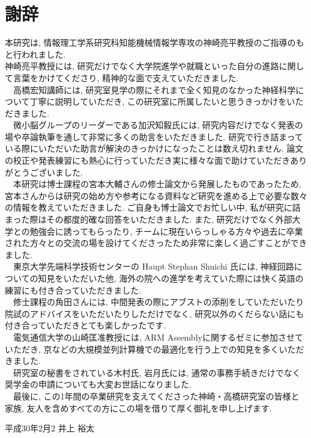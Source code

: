 \section*{謝辞}
本研究は, 情報理工学系研究科知能機械情報学専攻の神崎亮平教授のご指導のもと行われました.\\
神崎亮平教授には, 研究だけでなく大学院進学や就職といった自分の進路に関して言葉をかけてくださり, 精神的な面で支えていただきました.\\
　高橋宏知講師には, 研究室見学の際にそれまで全く知見のなかった神経科学について丁寧に説明していただき, この研究室に所属したいと思うきっかけをいただきました.\\
　微小脳グループのリーダーである加沢知毅氏には, 研究内容だけでなく発表の場や卒論執筆を通して非常に多くの助言をいただきました.
研究で行き詰まっている際にいただいた助言が解決のきっかけになったことは数え切れません. 論文の校正や発表練習にも熱心に行っていただき実に様々な面で助けていただきありがとうございました.\\
　本研究は博士課程の宮本大輔さんの修士論文から発展したものであったため, 宮本さんからは研究の始め方や参考になる資料など研究を進める上で必要な数々の情報を教えていただきました.
ご自身も博士論文でお忙しい中, 私が研究に詰まった際はその都度的確な回答をいただきました.
また, 研究だけでなく外部大学との勉強会に誘ってもらったり, チームに現在いらっしゃる方々や過去に卒業された方々との交流の場を設けてくださったため非常に楽しく過ごすことができました.\\
　東京大学先端科学技術センターの Haupt Stephan Shuichi 氏には, 神経回路についての知見をいただいた他, 海外の院への進学を考えていた際には快く英語の練習にも付き合っていただきました.\\
　修士課程の角田さんには, 中間発表の際にアブストの添削をしていただいたり院試のアドバイスをいただいたりしただけでなく, 研究以外のくだらない話にも付き合っていただきとても楽しかったです.\\
　電気通信大学の山崎匡准教授には, ARM Assemblyに関するゼミに参加させていただき, 京などの大規模並列計算機での最適化を行う上での知見を多くいただきました.\\
　研究室の秘書をされている木村氏, 岩月氏には, 通常の事務手続きだけでなく奨学金の申請についても大変お世話になりました.\\
　最後に, この1年間の卒業研究を支えてくださった神崎・高橋研究室の皆様と家族, 友人を含めすべての方にこの場を借りて厚く御礼を申し上げます.

\begin{flushright}
 平成30年2月2 井上 裕太
\end{flushright}
\clearpage

